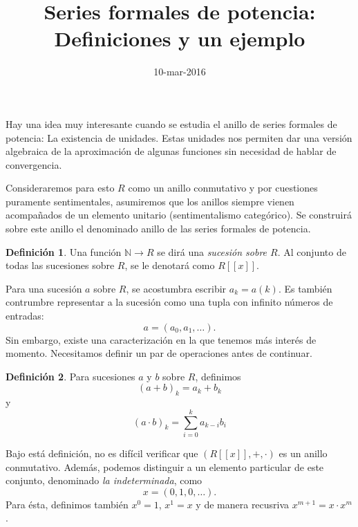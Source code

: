 \documentclass[letter,10pt,notitlepage]{amsart}
\title{Series formales de potencia: Definiciones y un ejemplo }
\date{10-mar-2016}
\theoremstyle{definition}
\newtheorem{definition}{Definición}
\theoremstyle{remark}
\begin{document}
\maketitle

Hay una idea muy interesante cuando se
estudia el anillo de series formales de potencia:
La existencia de unidades. Estas unidades nos 
permiten dar una versión algebraica de la aproximación
de algunas funciones sin necesidad de hablar de
convergencia.

Consideraremos para esto \( R\) 
como un anillo conmutativo y por cuestiones puramente 
sentimentales, asumiremos que los anillos siempre vienen 
acompañados de un elemento unitario (sentimentalismo categórico). 
Se construirá sobre este anillo el denominado anillo 
de las series formales de potencia.

\begin{definition}
  Una función \( \mathbb{N} \to R \) se dirá una 
  \emph{sucesión sobre \( R\)}. Al conjunto de todas 
  las sucesiones sobre \(R\), se le denotará como 
  \( R[[x]]\).
\end{definition}

Para una sucesión \(a\) sobre \(R\), se acostumbra 
escribir \(a_k = a(k)\). Es también contrumbre representar
a la sucesión como una tupla con infinito números de 
entradas:
\[ a = (a_0,a_1, \dots ).\]
Sin embargo, existe una caracterización en la que tenemos 
más interés de momento. Necesitamos definir un par de 
operaciones antes de continuar.

\begin{definition}
  \label{OP}
  Para sucesiones \(a\) y \(b\) sobre \(R\), definimos
  \[ (a + b)_k = a_k + b_k \]
  y
  \[ (a \cdot b)_k = \sum_{i=0}^ka_{k-i}b_{i}\]
\end{definition}

Bajo está definición, no es difícil verificar que 
\( (R[[x]],+,\cdot) \) es un anillo conmutativo. 
Además, podemos distinguir a un elemento particular
de este conjunto, denominado
\emph{la indeterminada}, como
\[ x = (0,1,0,\ldots).\]
Para ésta, definimos también \( x^0 = 1\), \( x^1 = x\) y
de manera recusriva \( x^{m+1} = x \cdot x^m \).
\end{document}
